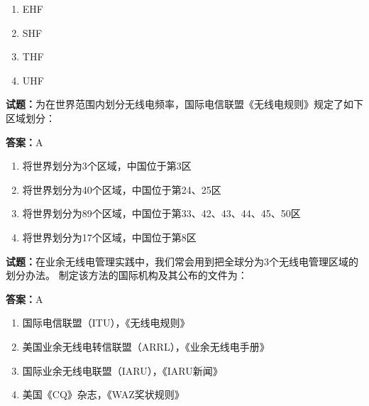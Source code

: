 \documentclass{ctexbook}
\begin{document}
\begin{enumerate}[leftmargin=3em]
  \item EHF 

  \item SHF 

  \item THF 

  \item UHF 

\end{enumerate}





\vspace{1em}

\textbf{试题：}为在世界范围内划分无线电频率，国际电信联盟《无线电规则》规定了如下区域划分： 

\textbf{答案：}A 


\begin{enumerate}[leftmargin=3em]
  \item 将世界划分为3个区域，中国位于第3区 

  \item 将世界划分为40个区域，中国位于第24、25区 

  \item 将世界划分为89个区域，中国位于第33、42、43、44、45、50区 

  \item 将世界划分为17个区域，中国位于第8区 

\end{enumerate}





\vspace{1em}

\textbf{试题：}在业余无线电管理实践中，我们常会用到把全球分为3个无线电管理区域的划分办法。
制定该方法的国际机构及其公布的文件为： 

\textbf{答案：}A 

\begin{enumerate}[leftmargin=3em]
  \item 国际电信联盟（ITU），《无线电规则》 

  \item 美国业余无线电转信联盟（ARRL），《业余无线电手册》 

  \item 国际业余无线电联盟（IARU），《IARU新闻》 

  \item 美国《CQ》杂志，《WAZ奖状规则》 

\end{enumerate}
\end{document}
